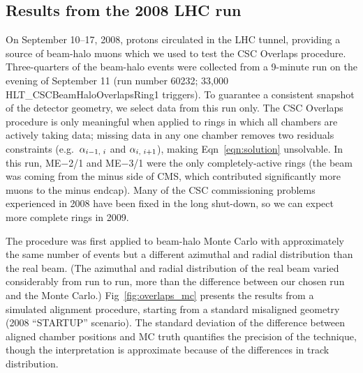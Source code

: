 \documentclass[12pt]{article}
\begin{document}
\subsection{Results from the 2008 LHC run}

On September 10--17, 2008, protons circulated in the LHC tunnel,
providing a source of beam-halo muons which we used to test the CSC
Overlaps procedure.  Three-quarters of the beam-halo events were
collected from a 9-minute run on the evening of September 11 (run
number 60232; 33,000 HLT\_CSCBeamHaloOverlapsRing1 triggers).  To
guarantee a consistent snapshot of the detector geometry, we select
data from this run only.  The CSC Overlaps procedure is only
meaningful when applied to rings in which all chambers are actively
taking data; missing data in any one chamber removes two residuals
constraints (e.g.\ $\alpha_{i-1\mbox{\scriptsize, }i}$ and
$\alpha_{i\mbox{\scriptsize, }i+1}$), making Eqn~\ref{eqn:solution}
unsolvable.  In this run, ME$-$2/1 and ME$-$3/1 were the only
completely-active rings (the beam was coming from the minus side of
CMS, which contributed significantly more muons to the minus endcap).
Many of the CSC commissioning problems experienced in 2008 have been
fixed in the long shut-down, so we can expect more complete rings in
2009.

The procedure was first applied to beam-halo Monte Carlo with
approximately the same number of events but a different azimuthal and
radial distribution than the real beam.  (The azimuthal and radial
distribution of the real beam varied considerably from run to run,
more than the difference between our chosen run and the Monte Carlo.)
Fig~\ref{fig:overlaps_mc} presents the results from a simulated
alignment procedure, starting from a standard misaligned geometry
(2008 ``STARTUP'' scenario).  The standard deviation of the difference
between aligned chamber positions and MC truth quantifies the
precision of the technique, though the interpretation is approximate
because of the differences in track distribution.
\end{document}
